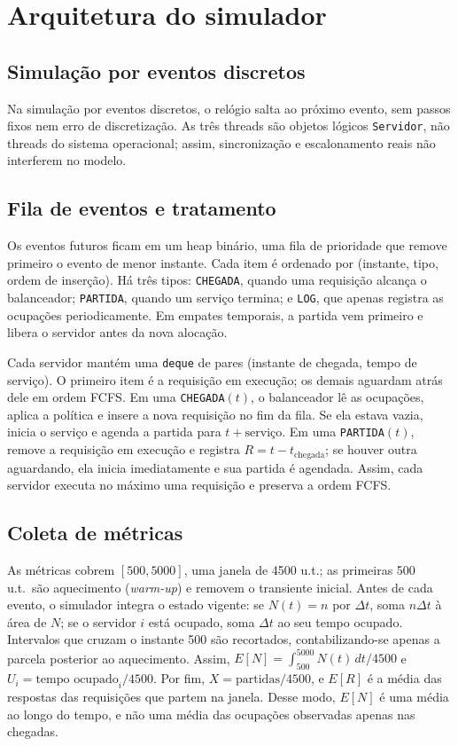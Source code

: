 \documentclass[conference,a4paper]{IEEEtran}
\begin{document}
\section{Arquitetura do simulador}

\subsection{Simulação por eventos discretos}

Na simulação por eventos discretos, o relógio salta ao próximo evento, sem
passos fixos nem erro de discretização. As três threads são objetos lógicos
\texttt{Servidor}, não threads do sistema operacional; assim, sincronização
e escalonamento reais não interferem no modelo.

\subsection{Fila de eventos e tratamento}

Os eventos futuros ficam em um heap binário, uma fila de prioridade que
remove primeiro o evento de menor instante. Cada item é ordenado por
(instante, tipo, ordem de inserção). Há três tipos: \texttt{CHEGADA}, quando
uma requisição alcança o balanceador; \texttt{PARTIDA}, quando um serviço
termina; e \texttt{LOG}, que apenas registra as ocupações periodicamente. Em
empates temporais, a partida vem primeiro e libera o servidor antes da nova
alocação.

Cada servidor mantém uma \texttt{deque} de pares (instante de chegada,
tempo de serviço). O primeiro item é a requisição em execução; os demais
aguardam atrás dele em ordem FCFS. Em uma \texttt{CHEGADA}$(t)$, o
balanceador lê as ocupações, aplica a política e insere a nova requisição no
fim da fila. Se ela estava vazia, inicia o serviço e agenda a partida para
$t+\text{serviço}$. Em uma \texttt{PARTIDA}$(t)$, remove a requisição em
execução e registra $R=t-t_{\mathrm{chegada}}$; se houver outra aguardando,
ela inicia imediatamente e sua partida é agendada. Assim, cada servidor
executa no máximo uma requisição e preserva a ordem FCFS.

\subsection{Coleta de métricas}

As métricas cobrem $[500,5000]$, uma janela de 4500 u.t.; as primeiras
500 u.t.\ são aquecimento (\emph{warm-up}) e removem o transiente inicial.
Antes de cada evento, o simulador integra o estado vigente: se $N(t)=n$ por
$\Delta t$, soma $n\Delta t$ à área de $N$; se o servidor $i$ está ocupado,
soma $\Delta t$ ao seu tempo ocupado. Intervalos que cruzam o instante 500
são recortados, contabilizando-se apenas a parcela posterior ao aquecimento.
Assim,
$E[N]=\int_{500}^{5000}N(t)\,dt/4500$ e
$U_i=\text{tempo ocupado}_i/4500$. Por fim,
$X=\text{partidas}/4500$, e $E[R]$ é a média das respostas das requisições
que partem na janela. Desse modo, $E[N]$ é uma média ao longo do tempo, e
não uma média das ocupações observadas apenas nas chegadas.
\end{document}
